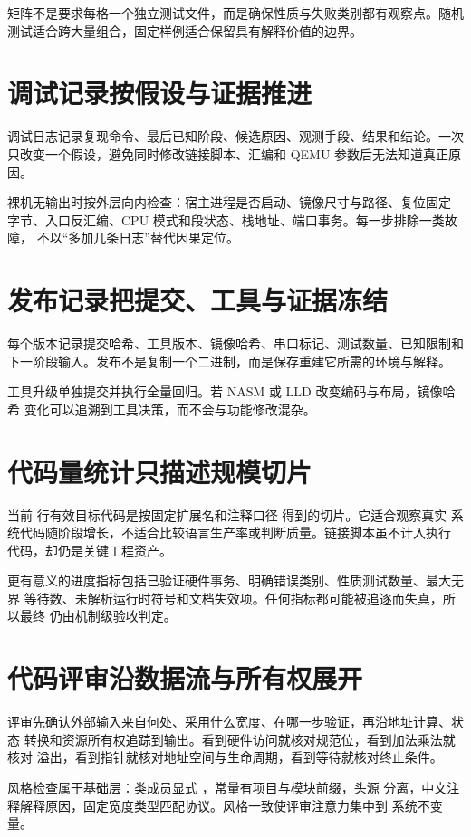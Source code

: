 矩阵不是要求每格一个独立测试文件，而是确保性质与失败类别都有观察点。随机
测试适合跨大量组合，固定样例适合保留具有解释价值的边界。

\section{调试记录按假设与证据推进}

调试日志记录复现命令、最后已知阶段、候选原因、观测手段、结果和结论。一次
只改变一个假设，避免同时修改链接脚本、汇编和 QEMU 参数后无法知道真正原因。

裸机无输出时按外层向内检查：宿主进程是否启动、镜像尺寸与路径、复位固定
字节、入口反汇编、CPU 模式和段状态、栈地址、端口事务。每一步排除一类故障，
不以“多加几条日志”替代因果定位。

\section{发布记录把提交、工具与证据冻结}

每个版本记录提交哈希、工具版本、镜像哈希、串口标记、测试数量、已知限制和
下一阶段输入。发布不是复制一个二进制，而是保存重建它所需的环境与解释。

工具升级单独提交并执行全量回归。若 NASM 或 LLD 改变编码与布局，镜像哈希
变化可以追溯到工具决策，而不会与功能修改混杂。

\section{代码量统计只描述规模切片}

当前 \OsProductionCodeLineCount{} 行有效目标代码是按固定扩展名和注释口径
得到的切片。它适合观察真实
系统代码随阶段增长，不适合比较语言生产率或判断质量。链接脚本虽不计入执行
代码，却仍是关键工程资产。

更有意义的进度指标包括已验证硬件事务、明确错误类别、性质测试数量、最大无界
等待数、未解析运行时符号和文档失效项。任何指标都可能被追逐而失真，所以最终
仍由机制级验收判定。

\section{代码评审沿数据流与所有权展开}

评审先确认外部输入来自何处、采用什么宽度、在哪一步验证，再沿地址计算、状态
转换和资源所有权追踪到输出。看到硬件访问就核对规范位，看到加法乘法就核对
溢出，看到指针就核对地址空间与生命周期，看到等待就核对终止条件。

风格检查属于基础层：类成员显式 ，常量有项目与模块前缀，头源
分离，中文注释解释原因，固定宽度类型匹配协议。风格一致使评审注意力集中到
系统不变量。

